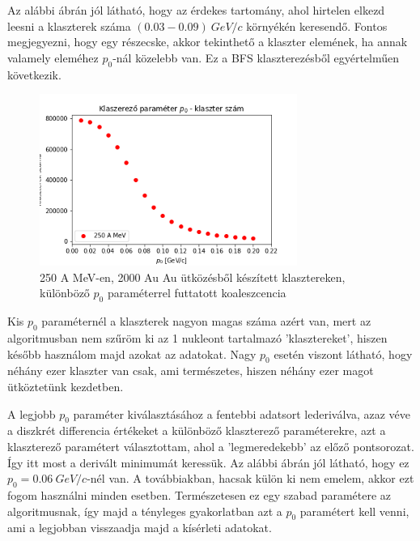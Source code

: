 \documentclass[a4paper,12pt]{article}
\begin{document}
\vspace{5mm}

\par Az alábbi ábrán jól látható, hogy az érdekes tartomány, ahol hirtelen elkezd leesni a klaszterek száma $(0.03 - 0.09) ~GeV/c$ környékén keresendő. Fontos megjegyezni, hogy egy részecske, akkor tekinthető a klaszter elemének, ha annak valamely eleméhez $p_{0}$-nál közelebb van. Ez a BFS klaszterezésből egyértelműen következik. 

\vspace{5mm}

\begin{figure}[H]
\centering
\includegraphics[width=0.75\textwidth]{./klaszterszamparameter.png}
\caption{250 A MeV-en, 2000 Au Au ütközésből készített klasztereken, különböző $p_{0}$ paraméterrel futtatott koaleszcencia}
\end{figure}

\vspace{5mm}

\par Kis $p_{0}$ paraméternél a klaszterek nagyon magas száma azért van, mert az algoritmusban nem szűröm ki az 1 nukleont tartalmazó 'klasztereket', hiszen később használom majd azokat az adatokat. Nagy $p_{0}$ esetén viszont látható, hogy néhány ezer klaszter van csak, ami természetes, hiszen néhány ezer magot ütköztetünk kezdetben.

\vspace{5mm}

\par A legjobb $p_{0}$ paraméter kiválasztásához a fentebbi adatsort lederiválva, azaz véve a diszkrét differencia értékeket a különböző klaszterező paraméterekre, azt a klaszterező paramétert választottam, ahol a 'legmeredekebb' az előző pontsorozat. Így itt most a derivált minimumát keressük. Az alábbi ábrán jól látható, hogy ez $p_{0} = 0.06 ~GeV/c$-nél van. A továbbiakban, hacsak külön ki nem emelem, akkor ezt fogom használni minden esetben. Természetesen ez egy szabad paramétere az algoritmusnak, így majd a tényleges gyakorlatban azt a $p_{0}$ paramétert kell venni, ami a legjobban visszaadja majd a kísérleti adatokat.
\end{document}
